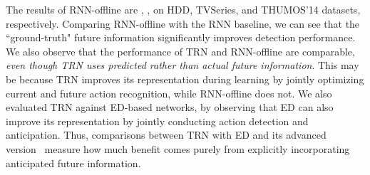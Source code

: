 \begin{table*}[t]
    \footnotesize
    \centering
        \vspace{-5pt}
        \caption{
            \textit{Online action detection results 
            when only portions of action sequences are considered,}
            in terms of cAP (\%). 
            For example, 20\%-30\%  means that the first 30\% of frames
            of the action were seen and classified, but only frames
            in the 20\%-30\% time range
            were used to compute cAP.
        }
        \label{table:early}
        \vspace{-5pt}
\end{table*}

 

The results of RNN-offline are , ,  on
HDD, TVSeries, and THUMOS'14 datasets, respectively. Comparing
RNN-offline with the RNN baseline, we can see that the ``ground-truth"
future information significantly improves detection performance. We
also observe that the performance of TRN and RNN-offline are
comparable, \textit{even though TRN uses predicted rather than actual
future information}. This may be because TRN improves its
representation during learning by jointly optimizing current
and future action
recognition, while RNN-offline does not. We also evaluated TRN against
ED-based networks, by observing that ED can also improve its
representation by
jointly conducting action detection and anticipation. Thus,
comparisons between TRN with ED and its advanced
version~\cite{gao2017red} measure how much benefit comes purely from
explicitly incorporating anticipated future information.


